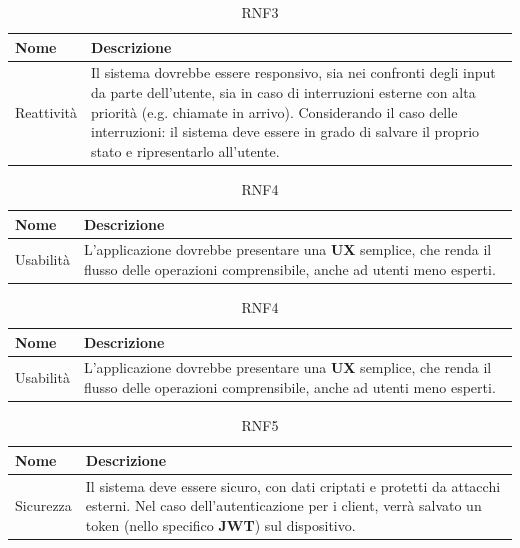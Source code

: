 \documentclass{natourDoc}
\begin{document}
\begin{table}[H]
	\centering
	\begin{tabular}{ |p{5cm}|p{10.3cm}| }
		\hline
		\rowcolor{PineGreen!70}
		\textbf{Nome} & \textbf{Descrizione}                                                                                             \\
		\hline
		Reattività    & Il sistema dovrebbe essere responsivo, sia nei confronti degli input da parte dell'utente, sia
		in caso di interruzioni esterne con alta priorità (e.g. chiamate in arrivo).
		Considerando il caso delle interruzioni: il sistema deve essere in grado di salvare il proprio stato e ripresentarlo all'utente. \\
		\hline
	\end{tabular}
	\caption{RNF3}
\end{table}

\begin{table}[H]
	\centering
	\begin{tabular}{ |p{5cm}|p{10.3cm}| }
		\hline
		\rowcolor{PineGreen!70}
		\textbf{Nome} & \textbf{Descrizione}                                                                              \\
		\hline
		Usabilità     & L'applicazione dovrebbe presentare una \textbf{UX} semplice, che renda il flusso delle operazioni
		comprensibile, anche ad utenti meno esperti.                                                                      \\
		\hline
	\end{tabular}
	\caption{RNF4}
\end{table}

\begin{table}[H]
	\centering
	\begin{tabular}{ |p{5cm}|p{10.3cm}| }
		\hline
		\rowcolor{PineGreen!70}
		\textbf{Nome} & \textbf{Descrizione}                                                                              \\
		\hline
		Usabilità     & L'applicazione dovrebbe presentare una \textbf{UX} semplice, che renda il flusso delle operazioni
		comprensibile, anche ad utenti meno esperti.                                                                      \\
		\hline
	\end{tabular}
	\caption{RNF4}
\end{table}

\begin{table}[H]
	\centering
	\begin{tabular}{ |p{5cm}|p{10.3cm}| }
		\hline
		\rowcolor{PineGreen!70}
		\textbf{Nome} & \textbf{Descrizione}                                                                              \\
		\hline
		Sicurezza     & Il sistema deve essere sicuro, con dati criptati e protetti da attacchi esterni.
		Nel caso dell'autenticazione per i client, verrà salvato un token (nello specifico \textbf{JWT}) sul dispositivo. \\
		\hline
	\end{tabular}
	\caption{RNF5}
\end{table}
\end{document}
